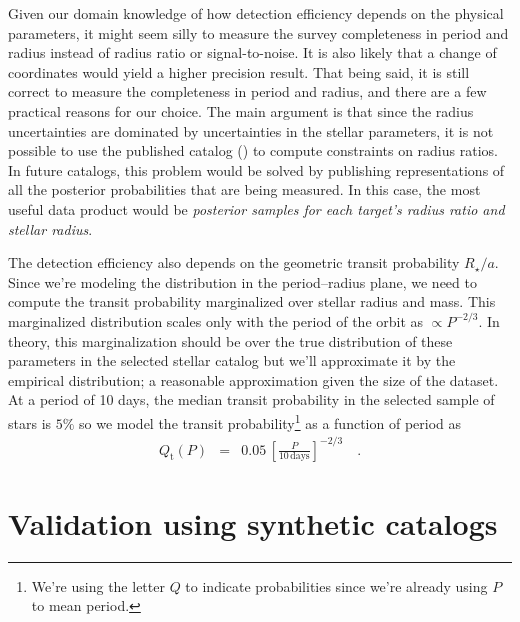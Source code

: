 \documentclass[12pt,preprint]{aastex}
\newcommand{\period}{\ensuremath{P}}
\newcommand{\transitprob}{{\ensuremath{Q_\mathrm{t}}}}
\begin{document}
Given our domain knowledge of how detection efficiency depends on the physical
parameters, it might seem silly to measure the survey completeness in period
and radius instead of radius ratio or signal-to-noise.
It is also likely that a change of coordinates would yield a higher precision
result.
That being said, it is still correct to measure the completeness in period and
radius, and there are a few practical reasons for our choice.
The main argument is that since the radius uncertainties are dominated by
uncertainties in the stellar parameters, it is not possible to use the
published catalog (\citealt{petigura}) to compute constraints on radius
ratios.
In future catalogs, this problem would be solved by publishing representations
of all the posterior probabilities that are being measured.
In this case, the most useful data product would be \emph{posterior samples
for each target's radius ratio and stellar radius}.

The detection efficiency also depends on the geometric transit probability
$R_\star/a$.
Since we're modeling the distribution in the period--radius plane, we need to
compute the transit probability marginalized over stellar radius and mass.
This marginalized distribution scales only with the period of the orbit as
$\propto \period^{-2/3}$.
In theory, this marginalization should be over the true distribution of these
parameters in the selected stellar catalog but we'll approximate it by
the empirical distribution; a reasonable approximation given the size of the
dataset.
At a period of 10 days, the median transit probability in the selected sample
of stars is $5\%$ so we model the transit probability\footnote{We're using the
letter $Q$ to indicate probabilities since we're already using $P$ to mean
period.} as a function of period as
\begin{eqnarray}
\transitprob (\period) &=&
    0.05\,\left[\frac{\period}{10\,\mathrm{days}}\right]^{-2/3} \quad.
\end{eqnarray}

\section{Validation using synthetic catalogs}
\end{document}
